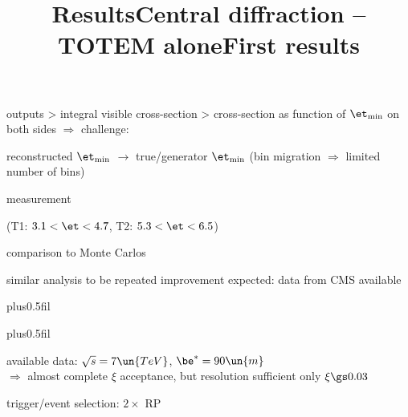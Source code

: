 \> outputs
\>> integral visible cross-section
\>> cross-section as function of $\et_{\rm min}$ on both sides $\Rightarrow$ challenge:

\centerline{reconstructed $\et_{\rm min}$ $\longrightarrow$ true/generator $\et_{\rm min}$ \hskip5mm (bin migration $\Rightarrow$ limited number of bins)}


\newpage %
\title{Results}


\noindent{}

\> measurement

\centerline{}

\centerline{(T1: $3.1 < \et < 4.7$, T2: $5.3 < \et < 6.5$)}

\> comparison to Monte Carlos

\centerline{}


\vfil
\noindent{}

{
\> similar analysis to be repeated
\> improvement expected: data from CMS available
}


\newpage %
\hbox{}
\vfil
\title{Central diffraction -- TOTEM alone}

\vskip0pt plus0.5fil

\vskip0pt plus0.5fil


\newpage %
\title{First results}

\> available data: $\sqrt s = 7\un{TeV}$, $\be^* = 90\un{m}$\\
$\Rightarrow$ almost complete $\xi$ acceptance, but resolution sufficient only $\xi \gs 0.03$

\> trigger/event selection: $2\times$ RP

